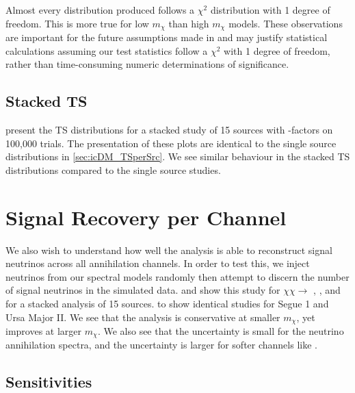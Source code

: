 Almost every distribution produced follows a $\chi^2$ distribution with 1 degree of freedom.
This is more true for low $m_\chi$ than high $m_\chi$ models.
These observations are important for the future assumptions made in  and may justify statistical calculations assuming our test statistics follow a $\chi^2$ with 1 degree of freedom, rather than time-consuming numeric determinations of significance.

\subsection{Stacked TS} \label{sec:icDM_TSstacked}

 present the TS distributions for a stacked study of 15 sources with \GS \J-factors on 100,000 trials.
The presentation of these plots are identical to the single source distributions in \cref{sec:icDM_TSperSrc}.
We see similar behaviour in the stacked TS distributions compared to the single source studies.

\section{Signal Recovery per Channel} \label{sec:icDM_sig_recovery}

We also wish to understand how well the analysis is able to reconstruct signal neutrinos across all annihilation channels.
In order to test this, we inject neutrinos from our spectral models randomly then attempt to discern the number of signal neutrinos in the simulated data.
 and  show this study for $\chi\chi \rightarrow$ , , and \parpar{\nu_\mu} for a stacked analysis of 15 sources.
 to  show identical studies for Segue 1 and Ursa Major II.
We see that the analysis is conservative at smaller $m_\chi$, yet improves at larger $m_\chi$.
We also see that the uncertainty is small for the neutrino annihilation spectra, and the uncertainty is larger for softer channels like .


\subsection{Sensitivities} \label{sec:icDM_sensitivity}

